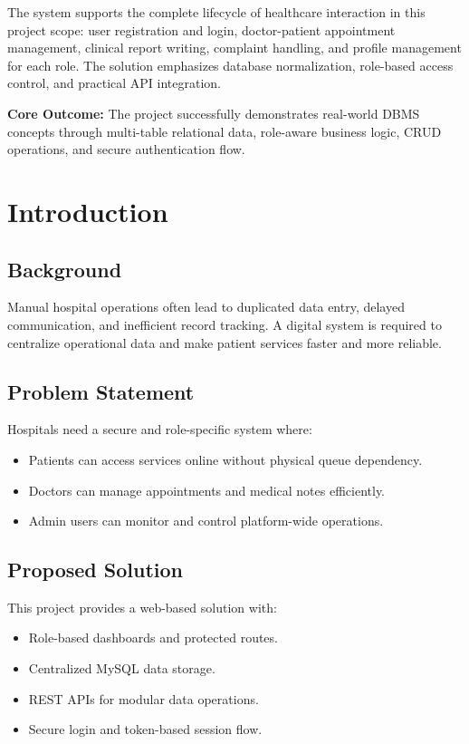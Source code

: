 \documentclass[12pt,a4paper]{article}
\newcommand{\infobox}[1]{
    \vspace{0.4em}
    \noindent\colorbox{SoftBlue}{\parbox{\dimexpr\linewidth-2\fboxsep\relax}{#1}}
    \vspace{0.4em}
}
\begin{document}
The system supports the complete lifecycle of healthcare interaction in this project scope: user registration and login, doctor-patient appointment management, clinical report writing, complaint handling, and profile management for each role. The solution emphasizes database normalization, role-based access control, and practical API integration.

\infobox{
\textbf{Core Outcome:} The project successfully demonstrates real-world DBMS concepts through multi-table relational data, role-aware business logic, CRUD operations, and secure authentication flow.
}

\newpage

\section{Introduction}
\subsection{Background}
Manual hospital operations often lead to duplicated data entry, delayed communication, and inefficient record tracking. A digital system is required to centralize operational data and make patient services faster and more reliable.

\subsection{Problem Statement}
Hospitals need a secure and role-specific system where:
\begin{itemize}[leftmargin=1.2cm]
    \item Patients can access services online without physical queue dependency.
    \item Doctors can manage appointments and medical notes efficiently.
    \item Admin users can monitor and control platform-wide operations.
\end{itemize}

\subsection{Proposed Solution}
This project provides a web-based solution with:
\begin{itemize}[leftmargin=1.2cm]
    \item Role-based dashboards and protected routes.
    \item Centralized MySQL data storage.
    \item REST APIs for modular data operations.
    \item Secure login and token-based session flow.
\end{itemize}
\end{document}
